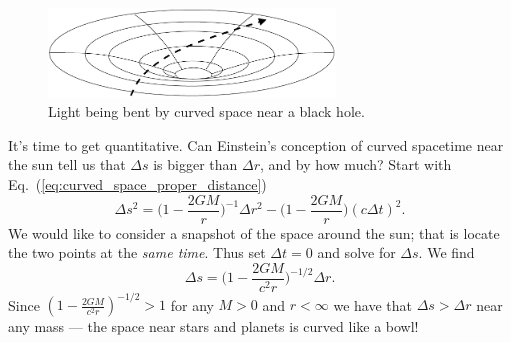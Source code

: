 \begin{figure}[b]
\begin{center}
\includegraphics[width=3in]{gravity_and_geometry/black-hole-bends-light.pdf}
\end{center}
\caption{Light being bent by curved space near a black hole.}
\label{fig:light-bent-by-curved-space}
\end{figure}
     
It's time to get quantitative.  Can Einstein's conception of curved
spacetime near the sun tell us that $\Delta s$ is bigger than $\Delta
r$, and by how much?  Start with
Eq.~(\ref{eq:curved_space_proper_distance})
\begin{equation}
  \Delta s^2 =  \biggl(1-\frac{2GM}{r}\biggr)^{-1}\Delta r^2 -  
  \biggl(1-\frac{2GM}{r}\biggr)(c\Delta t)^2.
\end{equation}
We would like to consider a snapshot of the space around the sun; that
is locate the two points at the \textit{same time}.  Thus set $\Delta
t=0$ and solve for $\Delta s$.  We find
\begin{equation}
  \Delta s = \biggl(1-\frac{2GM}{c^2 r}\biggr)^{-1/2}\Delta r.
\label{eq:schwarzschild_metric_iv}
\end{equation}
Since $(1-\frac{2GM}{c^2r})^{-1/2} > 1$ for any $M>0$ and $r<\infty$
we have that $\Delta s>\Delta r$ near any mass --- the space near
stars and planets is curved like a bowl!

